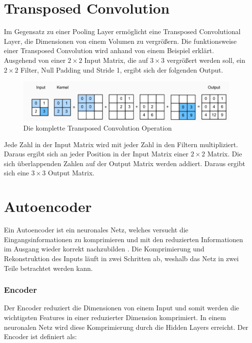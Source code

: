 \section{Transposed Convolution}
Im Gegensatz zu einer Pooling Layer ermöglicht eine Transposed Convolutional Layer, die Dimensionen von einem Volumen zu vergrößern.
Die funktionsweise einer Transposed Convolution wird anhand von einem Beispiel erklärt. 
\\
Ausgehend von einer $ 2 \times 2 $ Input Matrix, die auf $ 3 \times 3 $ vergrößert werden soll, ein $ 2 \times 2 $ Filter, 
Null Padding und Stride 1, ergibt sich der folgenden Output. 

\begin{figure}[H]
  \centering
  \includegraphics[width=1\textwidth]{resources/cnn/transposed-conv.png}
  \caption{
    Die komplette Transposed Convolution Operation
    \cite{zhang2020dive}
  }
  \label{image:transposed-conv}
\end{figure}

Jede Zahl in der Input Matrix wird mit jeder Zahl in den Filtern multipliziert. Daraus ergibt sich an jeder Position in der Input Matrix einer 
$ 2 \times 2 $ Matrix. Die sich überlappenden Zahlen auf der Output Matrix werden addiert. Daraus ergibt sich eine $ 3 \times 3 $ Output Matrix.

\section{Autoencoder}
Ein Autoencoder ist ein neuronales Netz, welches versucht die Eingangsinformationen zu komprimieren und mit den reduzierten Informationen 
im Ausgang wieder korrekt nachzubilden \cite{was-ist-autoencoder}. Die Komprimierung und Rekonstruktion des Inputs läuft in zwei Schritten ab, 
weshalb das Netz in zwei Teile betrachtet werden kann.
\\
\subsubsection{Encoder}
Der Encoder reduziert die Dimensionen von einem Input und somit werden die wichtigsten Features in einer reduzierter Dimension komprimiert.
In einem neuronalen Netz wird diese Komprimierung durch die Hidden Layers erreicht. Der Encoder ist definiert als:

